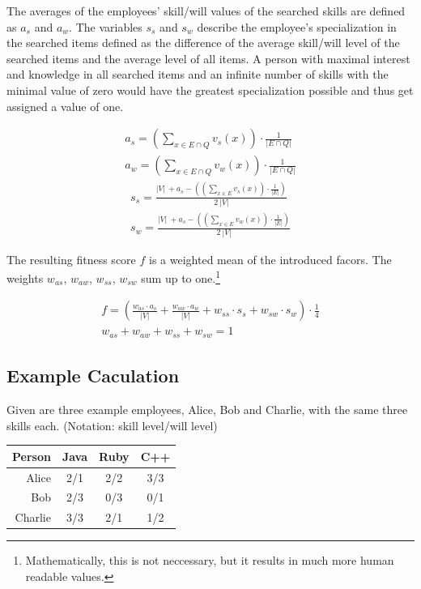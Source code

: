 The averages of the employees' skill/will values of the searched skills are defined as $a_s$ and $a_w$.
The variables $s_s$ and $s_w$ describe the employee's specialization in the searched items defined as the difference
of the average skill/will level of the searched items and the average level of all items.
A person with maximal interest and knowledge in all searched items and an infinite number of skills with the minimal
value of zero would have the greatest specialization possible and thus get assigned a value of one.

\begin{gather*}
  a_s = \left( \sum_{x \in E \cap Q} v_s(x) \right) \cdot \frac{1}{|E \cap Q|} \\
  a_w = \left( \sum_{x \in E \cap Q} v_w(x) \right) \cdot \frac{1}{|E \cap Q|}
\end{gather*}
\begin{gather*}
  s_s = \frac{|V| \ + a_s - \left( \left( \sum_{x \in E} v_s(x)\right) \cdot \frac{1}{|E|} \right)}{2 \ |V|}\\
  s_w = \frac{|V| \ + a_s - \left( \left( \sum_{x \in E} v_w(x)\right) \cdot \frac{1}{|E|} \right)}{2 \ |V|}
\end{gather*}

The resulting fitness score $f$ is a weighted mean of the introduced facors. The weights $w_{as}$, $w_{aw}$, $w_{ss}$, $w_{sw}$ sum up to one.\footnote{Mathematically, this is not neccessary, but it results in much more human readable values.}

\begin{gather*}
  f = \left(\frac{w_{as} \cdot a_s}{|V|} + \frac{w_{aw} \cdot a_w}{|V|} + w_{ss} \cdot s_s + w_{sw} \cdot s_w \right) \cdot \frac{1}{4} \\
  w_{as} + w_{aw} + w_{ss} + w_{sw} = 1
\end{gather*}

\subsection{Example Caculation}
Given are three example employees, Alice, Bob and Charlie, with the same three skills each.
(Notation: skill level/will level)
\newline
\newline
\begin{center}
\begin{tabular}{r|ccc}
  Person  & Java & Ruby & C++ \\
  \hline
  Alice   & 2/1  & 2/2 & 3/3 \\
  Bob     & 2/3  & 0/3 & 0/1 \\
  Charlie & 3/3  & 2/1 & 1/2 \\
\end{tabular}
\end{center}

